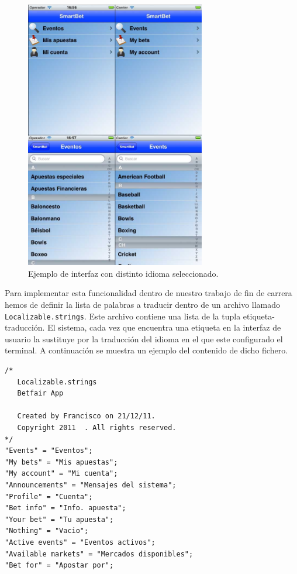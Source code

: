   
  
  \begin{figure}[h!]
  	\centering 
  		\includegraphics[width=0.7\textwidth]{./images/lenguajes.jpg}
	\caption{Ejemplo de interfaz con distinto idioma seleccionado.} 
	\label{fig:Ejemplo de interfaz con distinto idioma seleccionado.}
\end{figure} 
  
  
  
  Para implementar esta funcionalidad dentro de nuestro trabajo de fin de carrera hemos de definir la lista de palabras a traducir dentro de un archivo llamado \lstinline!Localizable.strings!.  Este archivo contiene una lista de la tupla etiqueta-traducción. El sistema, cada vez que encuentra una etiqueta en la interfaz de usuario la sustituye por la traducción del idioma en el que este configurado el terminal. A continuación se muestra un ejemplo del contenido de dicho fichero.
  
\begin{lstlisting}
/* 
   Localizable.strings
   Betfair App

   Created by Francisco on 21/12/11.
   Copyright 2011  . All rights reserved.
*/
"Events" = "Eventos";
"My bets" = "Mis apuestas";
"My account" = "Mi cuenta";
"Announcements" = "Mensajes del sistema";
"Profile" = "Cuenta";
"Bet info" = "Info. apuesta";
"Your bet" = "Tu apuesta";
"Nothing" = "Vacio";
"Active events" = "Eventos activos";
"Available markets" = "Mercados disponibles";
"Bet for" = "Apostar por";  
\end{lstlisting}

